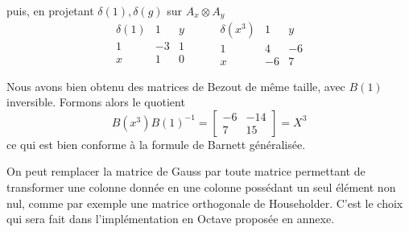 \documentclass{standalone}
\begin{document}
  puis, en projetant $\delta(1), \delta(g)$ sur $A_x \otimes A_y$
  $$
  \begin{array}{c|cc}
  	\delta(1) & 1 & y \\
  	\hline
  	1 & -3 & 1 \\
  	x & 1 & 0
  \end{array}
  \hspace{1cm}
  \begin{array}{c|cc}
  	\delta(x^3) & 1 & y \\
  	\hline
  	1 & 4 & -6  \\
  	x & -6 & 7
  \end{array}
  $$

  Nous avons bien obtenu des matrices de Bezout de même taille, avec $B(1)$ inversible. Formons alors le quotient
  \begin{equation}
  	B(x^3)B(1)^{-1} =
  	\begin{bmatrix}
  		-6 & -14 \\
  		7 & 15
  	\end{bmatrix}
  	= X^3
  \end{equation}
  ce qui est bien conforme à la formule de Barnett généralisée.

  \begin{rem}
  On peut remplacer la matrice de Gauss par toute matrice permettant de transformer une colonne donnée en une colonne possédant un seul élément non nul, comme par exemple une matrice orthogonale de Householder. C'est le choix qui sera fait dans l'implémentation en Octave proposée en annexe.

  \end{rem}

\end{document}
